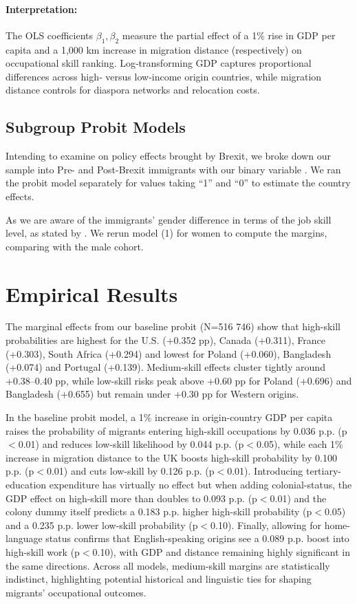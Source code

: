 \documentclass[12pt, a4paper]{article}
\begin{document}
\paragraph{Interpretation:}
The OLS coefficients $\beta_{1},\beta_{2}$ measure the partial effect of a 1\% rise in GDP per capita and a 1,000 km increase in migration distance (respectively) on occupational skill ranking.  Log‐transforming GDP captures proportional differences across high‐ versus low‐income origin countries, while migration distance controls for diaspora networks and relocation costs.

\bigskip
\subsection{Subgroup Probit Models}
  Intending to examine on policy effects brought by Brexit, we broke down our sample into Pre- and Post-Brexit immigrants with our binary variable . We ran the probit model separately for  values taking “1” and “0” to estimate the country effects.

As we are aware of the immigrants’ gender difference in terms of the job skill level, as stated by \citet{AdseraGender}. We rerun model (1) for women to compute the margins, comparing with the male cohort. 

\section{Empirical Results} \label{sec:emp}

 The marginal effects from our baseline probit (N=516 746) show that high-skill probabilities are highest for the U.S. (+0.352 pp), Canada (+0.311), France (+0.303), South Africa (+0.294) and lowest for Poland (+0.060), Bangladesh (+0.074) and Portugal (+0.139).  Medium-skill effects cluster tightly around +0.38–0.40 pp, while low-skill risks peak above +0.60 pp for Poland (+0.696) and Bangladesh (+0.655) but remain under +0.30 pp for Western origins. 
 
In the baseline probit model, a 1\% increase in origin-country GDP per capita raises the probability of migrants entering high-skill occupations by 0.036 p.p. (p$<$0.01) and reduces low-skill likelihood by 0.044 p.p. (p$<$0.05), while each 1\% increase in migration distance to the UK boosts high-skill probability by 0.100 p.p. (p$<$0.01) and cuts low-skill by 0.126 p.p. (p$<$0.01).  Introducing tertiary-education expenditure has virtually no effect but when adding colonial-status, the GDP effect on high-skill more than doubles to 0.093 p.p. (p$<$0.01) and the colony dummy itself predicts a 0.183 p.p. higher high-skill probability (p$<$0.05) and a 0.235 p.p. lower low-skill probability (p$<$0.10).  Finally, allowing for home-language status confirms that English-speaking origins see a 0.089 p.p. boost into high-skill work (p$<$0.10), with GDP and distance remaining highly significant in the same directions. Across all models, medium-skill margins are statistically indistinct, highlighting potential historical and linguistic ties for shaping migrants’ occupational outcomes.
\end{document}

